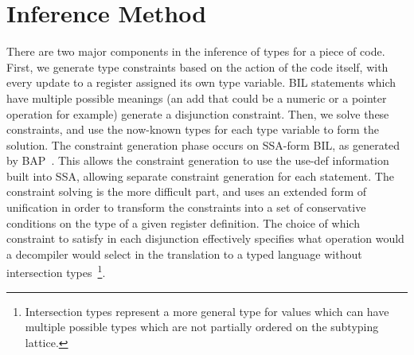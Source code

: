 \section{Inference Method}
\label{sec:infmeth}
There are two major components in the inference of types for a piece of code. First, we generate type constraints based on the action of the code itself, with every update to a register assigned its own type variable. BIL statements which have multiple possible meanings (an add that could be a numeric or a pointer operation for example) generate a disjunction constraint. Then, we solve these constraints, and use the now-known types for each type variable to form the solution. The constraint generation phase occurs on SSA-form BIL, as generated by BAP~\cite{bap}.
This allows the constraint generation to use the use-def information built into SSA, allowing separate constraint generation for each statement.
The constraint solving is the more difficult part, and uses an extended form of unification in order to transform the constraints into a set of conservative conditions on the type of a given register definition.
The choice of which constraint to satisfy in each disjunction effectively specifies what operation would a decompiler would select in the translation to a typed language without intersection types~\cite{Jim1995,Shao1993}\footnote{
	Intersection types represent a more general type for values which can have multiple possible types which are not partially ordered on the subtyping lattice.
}.



